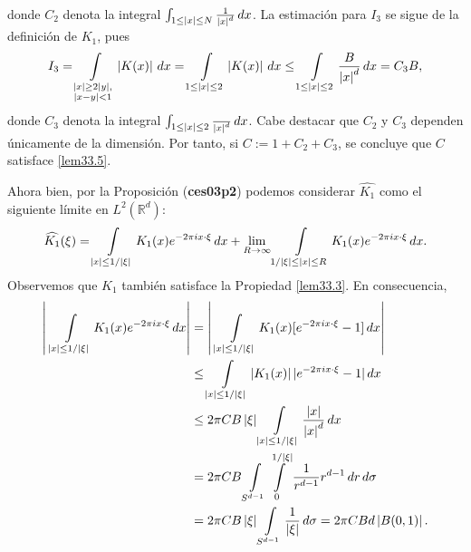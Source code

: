 \documentclass{myarticle}
\newcommand{\abs}[1]{\left|{#1}\right|}
\newcommand{\abss}[1]{\vert #1 \vert}
\newcommand{\reales}{\mathbb{R}}
\newcommand{\lp}[2]{L^{#1}(#2)}
\begin{document}
{donde $C_2$ denota la integral $\int\displaylimits_{1\leq\abs{x}\leq N}\frac{1}{\abs{x}^d}\, dx$.
La estimación para $I_3$ se sigue de la definición de $K_1$, pues
$$I_3=\int\displaylimits_{\substack{\abs{x}\geq 2\abs{y},\\ \abs{x-y}< 1}}\abs{K(x)}\, dx=\int\displaylimits_{1\leq\abs{x}\leq 2}\abs{K(x)}\, dx\leq\int\displaylimits_{1\leq\abs{x}\leq 2}\frac{B}{\abs{x}^d}\, dx=C_3B,$$
donde $C_3$ denota la integral $\int\displaylimits_{1\leq\abs{x}\leq 2}\frac{}{\abs{x}^d}\, dx$. Cabe destacar que $C_2$ y $C_3$ dependen únicamente de la dimensión. Por tanto, si $C:=1+C_2+C_3$, se concluye que $C$ satisface \eqref{lem33.5}}.

Ahora bien, por la Proposición (\textbf{ces03p2}) podemos considerar $\widehat{K_1}$ como  el siguiente límite en $\lp{2}{\reales^d}$:
\begin{align*}
\widehat{K_1}(\xi)=\int\displaylimits_{\abs{x}\leq 1/\abs{\xi}} K_1(x)e^{-2\pi ix\cdot\xi}\, dx+\lim_{R\to\infty}\int\displaylimits_{1/\abs{\xi}\leq\abs{x}\leq R}K_1(x)e^{-2\pi ix\cdot\xi}\, dx.
\end{align*}
Observemos que $K_1$ también satisface la Propiedad \eqref{lem33.3}. En consecuencia,
\begin{align*}
\abs{\,\,\int\displaylimits_{\abs{x}\leq 1/\abs{\xi}} K_1(x)e^{-2\pi ix\cdot\xi}\, dx}&=\abs{\,\,\int\displaylimits_{\abs{x}\leq 1/\abs{\xi}} K_1(x)[e^{-2\pi ix\cdot\xi}-1]\, dx}\\
&\leq \int\displaylimits_{\abs{x}\leq 1/\abs{\xi}} \abs{K_1(x)}\abss{e^{-2\pi ix\cdot\xi}-1}\, dx\\
&\leq2\pi CB\abs{\xi}\int\displaylimits_{\abs{x}\leq 1/\abs{\xi}}\frac{\abs{x}}{\abs{x}^d}\, dx\\
&=2\pi CB\int\displaylimits_{S^{d-1}}\int\displaylimits_{0}^{1/\abs{\xi}}\frac{1}{r^{d-1}}r^{d-1}\, dr\,d\sigma\\
&=2\pi CB\abs{\xi}\int\displaylimits_{S^{d-1}}\frac{1}{\abs{\xi}}\, d\sigma=2\pi CB d\abs{B(0,1)}.
\end{align*}
\end{document}
